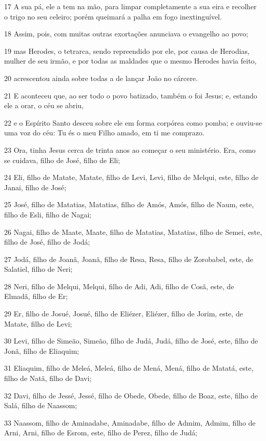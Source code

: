 \par 17 A sua pá, ele a tem na mão, para limpar completamente a sua eira e recolher o trigo no seu celeiro; porém queimará a palha em fogo inextinguível.
\par 18 Assim, pois, com muitas outras exortações anunciava o evangelho ao povo;
\par 19 mas Herodes, o tetrarca, sendo repreendido por ele, por causa de Herodias, mulher de seu irmão, e por todas as maldades que o mesmo Herodes havia feito,
\par 20 acrescentou ainda sobre todas a de lançar João no cárcere.
\par 21 E aconteceu que, ao ser todo o povo batizado, também o foi Jesus; e, estando ele a orar, o céu se abriu,
\par 22 e o Espírito Santo desceu sobre ele em forma corpórea como pomba; e ouviu-se uma voz do céu: Tu és o meu Filho amado, em ti me comprazo.
\par 23 Ora, tinha Jesus cerca de trinta anos ao começar o seu ministério. Era, como se cuidava, filho de José, filho de Eli;
\par 24 Eli, filho de Matate, Matate, filho de Levi, Levi, filho de Melqui, este, filho de Janai, filho de José;
\par 25 José, filho de Matatias, Matatias, filho de Amós, Amós, filho de Naum, este, filho de Esli, filho de Nagai;
\par 26 Nagai, filho de Maate, Maate, filho de Matatias, Matatias, filho de Semei, este, filho de José, filho de Jodá;
\par 27 Jodá, filho de Joanã, Joanã, filho de Resa, Resa, filho de Zorobabel, este, de Salatiel, filho de Neri;
\par 28 Neri, filho de Melqui, Melqui, filho de Adi, Adi, filho de Cosã, este, de Elmadã, filho de Er;
\par 29 Er, filho de Josué, Josué, filho de Eliézer, Eliézer, filho de Jorim, este, de Matate, filho de Levi;
\par 30 Levi, filho de Simeão, Simeão, filho de Judá, Judá, filho de José, este, filho de Jonã, filho de Eliaquim;
\par 31 Eliaquim, filho de Meleá, Meleá, filho de Mená, Mená, filho de Matatá, este, filho de Natã, filho de Davi;
\par 32 Davi, filho de Jessé, Jessé, filho de Obede, Obede, filho de Boaz, este, filho de Salá, filho de Naassom;
\par 33 Naassom, filho de Aminadabe, Aminadabe, filho de Admim, Admim, filho de Arni, Arni, filho de Esrom, este, filho de Perez, filho de Judá;
